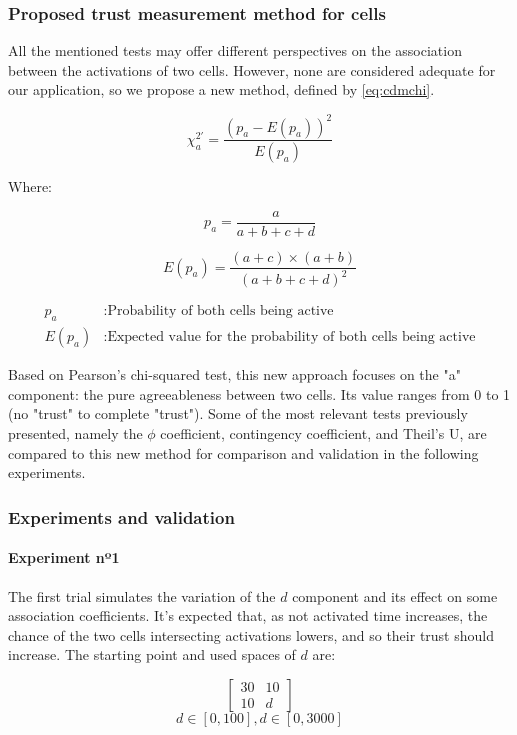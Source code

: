 \subsubsection{Proposed trust measurement method for cells}

All the mentioned tests may offer different perspectives on the association between the activations of two cells. However, none are considered adequate for our application, so we propose a new method, defined by \ref{eq:cdmchi}.

\begin{equation} \label{eq:cdmchi}
    \chi_a^{2'} = \frac{(p_a - E(p_a))^2}{E(p_a)}
\end{equation}

Where:

\[
    p_a = \frac{a}{a+b+c+d}
\]

\[
    E(p_a) = \frac{(a + c) \times (a + b)}{(a+b+c+d)^2}
\]

\begin{align*}
    p_a &: \text{Probability of both cells being active} \\
    E(p_a) &: \text{Expected value for the probability of both cells being active}
\end{align*}

Based on Pearson's chi-squared test, this new approach focuses on the "a" component: the pure agreeableness between two cells. Its value ranges from 0 to 1 (no "trust" to complete "trust"). Some of the most relevant tests previously presented, namely the $\phi$ coefficient, contingency coefficient, and Theil's U, are compared to this new method for comparison and validation in the following experiments.

\subsubsection{Experiments and validation}

\paragraph{Experiment nº1}

The first trial simulates the variation of the $d$ component and its effect on some association coefficients. It's expected that, as not activated time increases, the chance of the two cells intersecting activations lowers, and so their trust should increase. The starting point and used spaces of $d$ are:

$$
\begin{bmatrix}
    30 & 10 \\ 10 & d
\end{bmatrix}
$$
$$
d \in [0, 100], d \in [0, 3000]
$$

